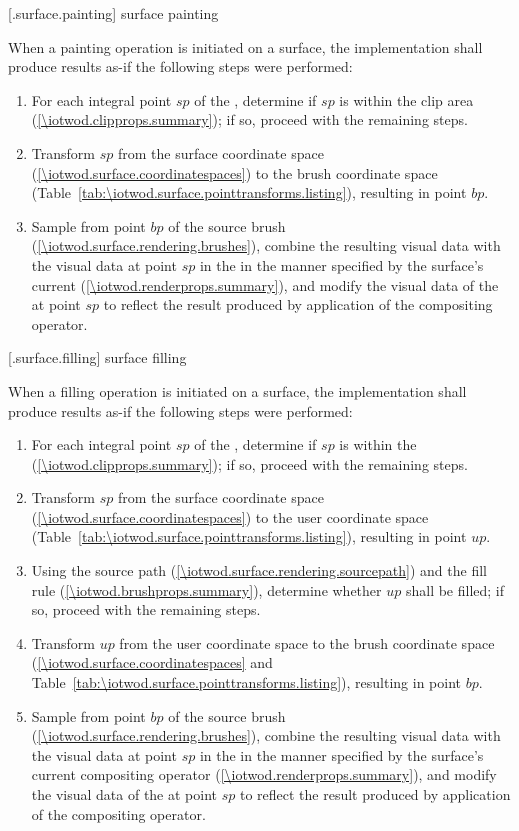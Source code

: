  [\iotwod.surface.painting] {surface painting}

\pnum
When a painting operation is initiated on a surface, the implementation shall produce results as-if the following steps were performed:

\begin{enumerate}
\item For each integral point $sp$ of the \underlyingsurface, determine if $sp$ is within the clip area (\ref{\iotwod.clipprops.summary}); if so, proceed with the remaining steps.
\item Transform $sp$ from the surface coordinate space (\ref{\iotwod.surface.coordinatespaces}) to the brush coordinate space (Table~\ref{tab:\iotwod.surface.pointtransforms.listing}), resulting in point $bp$.
\item Sample from point $bp$ of the source brush (\ref{\iotwod.surface.rendering.brushes}), combine the resulting visual data with the visual data at point $sp$ in the \underlyingsurface in the manner specified by the surface's current  (\ref{\iotwod.renderprops.summary}), and modify the visual data of the \underlyingsurface at point $sp$ to reflect the result produced by application of the compositing operator.
\end{enumerate}

 [\iotwod.surface.filling] {surface filling}

\pnum
When a filling operation is initiated on a surface, the implementation shall produce results as-if the following steps were performed:

\begin{enumerate}
\item For each integral point $sp$ of the \underlyingsurface, determine if $sp$ is within the  (\ref{\iotwod.clipprops.summary}); if so, proceed with the remaining steps.
\item Transform $sp$ from the surface coordinate space (\ref{\iotwod.surface.coordinatespaces}) to the user coordinate space (Table~\ref{tab:\iotwod.surface.pointtransforms.listing}), resulting in point $up$.
\item Using the source path (\ref{\iotwod.surface.rendering.sourcepath}) and the fill rule (\ref{\iotwod.brushprops.summary}), determine whether $up$ shall be filled; if so, proceed with the remaining steps.
\item Transform $up$ from the user coordinate space to the brush coordinate space (\ref{\iotwod.surface.coordinatespaces} and Table~\ref{tab:\iotwod.surface.pointtransforms.listing}), resulting in point $bp$.
\item Sample from point $bp$ of the source brush (\ref{\iotwod.surface.rendering.brushes}), combine the resulting visual data with the visual data at point $sp$ in the \underlyingsurface in the manner specified by the surface's current compositing operator (\ref{\iotwod.renderprops.summary}), and modify the visual data of the \underlyingsurface at point $sp$ to reflect the result produced by application of the compositing operator.
\end{enumerate}

